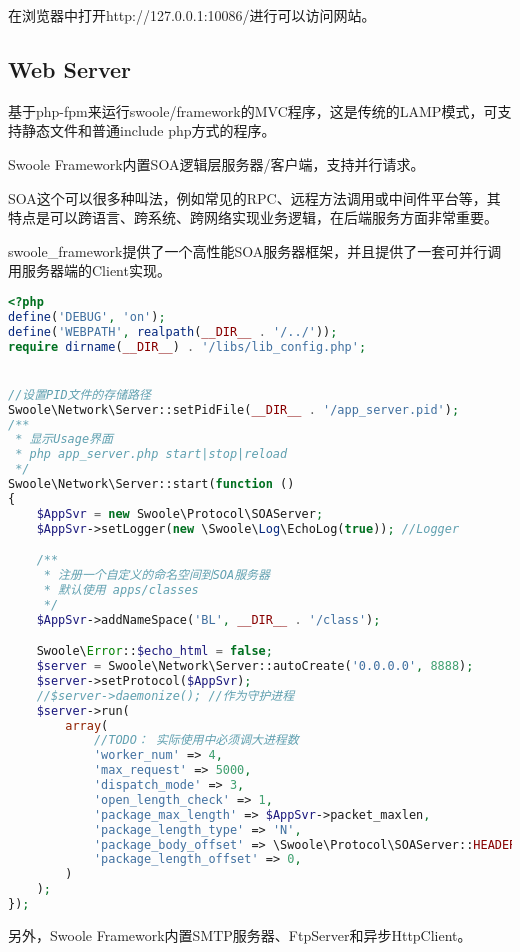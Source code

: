 在浏览器中打开http://127.0.0.1:10086/进行可以访问网站。

\subsection{Web Server}

基于php-fpm来运行swoole/framework的MVC程序，这是传统的LAMP模式，可支持静态文件和普通include php方式的程序。

Swoole Framework内置SOA逻辑层服务器/客户端，支持并行请求。

SOA这个可以很多种叫法，例如常见的RPC、远程方法调用或中间件平台等，其特点是可以跨语言、跨系统、跨网络实现业务逻辑，在后端服务方面非常重要。

swoole\_framework提供了一个高性能SOA服务器框架，并且提供了一套可并行调用服务器端的Client实现。


\begin{lstlisting}[language=PHP]
<?php
define('DEBUG', 'on');
define('WEBPATH', realpath(__DIR__ . '/../'));
require dirname(__DIR__) . '/libs/lib_config.php';


//设置PID文件的存储路径
Swoole\Network\Server::setPidFile(__DIR__ . '/app_server.pid');
/**
 * 显示Usage界面
 * php app_server.php start|stop|reload
 */
Swoole\Network\Server::start(function ()
{
    $AppSvr = new Swoole\Protocol\SOAServer;
    $AppSvr->setLogger(new \Swoole\Log\EchoLog(true)); //Logger

    /** 
     * 注册一个自定义的命名空间到SOA服务器
     * 默认使用 apps/classes
     */
    $AppSvr->addNameSpace('BL', __DIR__ . '/class');

    Swoole\Error::$echo_html = false;
    $server = Swoole\Network\Server::autoCreate('0.0.0.0', 8888);
    $server->setProtocol($AppSvr);
    //$server->daemonize(); //作为守护进程
    $server->run(
        array(
            //TODO： 实际使用中必须调大进程数
            'worker_num' => 4,
            'max_request' => 5000,
            'dispatch_mode' => 3,
            'open_length_check' => 1,
            'package_max_length' => $AppSvr->packet_maxlen,
            'package_length_type' => 'N',
            'package_body_offset' => \Swoole\Protocol\SOAServer::HEADER_SIZE,
            'package_length_offset' => 0,
        )
    );  
});
\end{lstlisting}

另外，Swoole Framework内置SMTP服务器、FtpServer和异步HttpClient。


